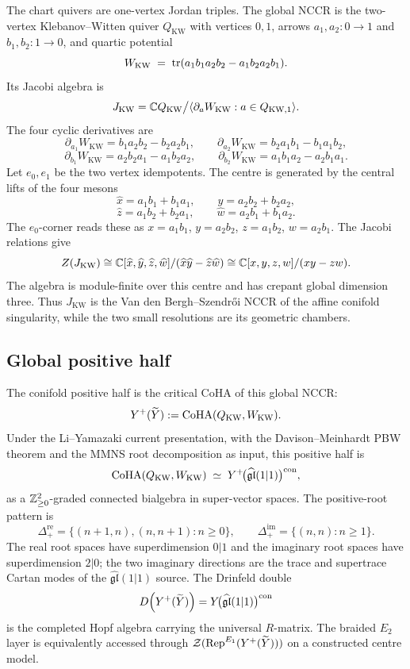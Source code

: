 The chart quivers are one-vertex Jordan triples.  The global NCCR is
the two-vertex Klebanov--Witten quiver $Q_{\mathrm{KW}}$ with vertices
$0,1$, arrows
$a_{1},a_{2}\colon 0\to 1$ and $b_{1},b_{2}\colon 1\to 0$, and quartic
potential
\[
  W_{\mathrm{KW}} \;=\; \mathrm{tr}(a_{1}b_{1}a_{2}b_{2}-a_{1}b_{2}a_{2}b_{1}).
\]
Its Jacobi algebra is
\[
  J_{\mathrm{KW}}
  =
  \mathbb{C} Q_{\mathrm{KW}}\big/
  \langle \partial_a W_{\mathrm{KW}}: a\in Q_{\mathrm{KW},1}\rangle .
\]
The four cyclic derivatives are
\[
 \partial_{a_1}W_{\mathrm{KW}}=b_1a_2b_2-b_2a_2b_1,\qquad
 \partial_{a_2}W_{\mathrm{KW}}=b_2a_1b_1-b_1a_1b_2,
\]
\[
 \partial_{b_1}W_{\mathrm{KW}}=a_2b_2a_1-a_1b_2a_2,\qquad
 \partial_{b_2}W_{\mathrm{KW}}=a_1b_1a_2-a_2b_1a_1.
\]
Let $e_0,e_1$ be the two vertex idempotents.  The centre is generated
by the central lifts of the four mesons
\[
  \widehat x=a_1b_1+b_1a_1,\qquad
  \widehat y=a_2b_2+b_2a_2,
\]
\[
  \widehat z=a_1b_2+b_2a_1,\qquad
  \widehat w=a_2b_1+b_1a_2.
\]
The $e_0$-corner reads these as
$x=a_1b_1$, $y=a_2b_2$, $z=a_1b_2$, $w=a_2b_1$.  The Jacobi relations
give
\[
  Z(J_{\mathrm{KW}})
  \cong
  \mathbb{C}[\widehat x,\widehat y,\widehat z,\widehat w]/
  (\widehat x\widehat y-\widehat z\widehat w)
  \cong
  \mathbb{C}[x,y,z,w]/(xy-zw).
\]
The algebra is module-finite over this centre and has crepant global
dimension three.  Thus $J_{\mathrm{KW}}$ is the Van den
Bergh--Szendr\H{o}i NCCR of the affine conifold singularity, while the
two small resolutions are its geometric chambers.

\subsection*{Global positive half}

The conifold positive half is the critical CoHA of this global NCCR:
\[
  Y^{+}(\widetilde{Y})
  :=
  \mathrm{CoHA}(Q_{\mathrm{KW}},W_{\mathrm{KW}}).
\]
Under the Li--Yamazaki current presentation, with the
Davison--Meinhardt PBW theorem and the MMNS root decomposition as input,
this positive half is
\[
  \mathrm{CoHA}(Q_{\mathrm{KW}},W_{\mathrm{KW}})
  \;\simeq\;
  Y^+\!\bigl(\widehat{\mathfrak{gl}}(1|1)\bigr)^{\mathrm{con}},
\]
as a $\mathbb{Z}_{\geq 0}^2$-graded connected bialgebra in super-vector spaces.
The positive-root pattern is
\[
\Delta_{+}^{\mathrm{re}} = \{(n+1,n),(n,n+1):n\ge 0\},
\qquad
\Delta_{+}^{\mathrm{im}}=\{(n,n):n\ge 1\}.
\]
The real root spaces have superdimension $0|1$ and the imaginary root
spaces have superdimension $2|0$; the two imaginary directions are the
trace and supertrace Cartan modes of the $\widehat{\mathfrak{gl}}(1|1)$
source.  The Drinfeld double
\[
  D\!\left(Y^{+}(\widetilde{Y})\right)
  =
  Y\!\bigl(\widehat{\mathfrak{gl}}(1|1)\bigr)^{\mathrm{con}}
\]
is the completed Hopf algebra carrying the universal $R$-matrix.  The
braided $E_2$ layer is equivalently accessed through
$\mathcal Z(\mathrm{Rep}^{E_1}(Y^{+}(\widetilde{Y})))$ on a constructed
centre model.

